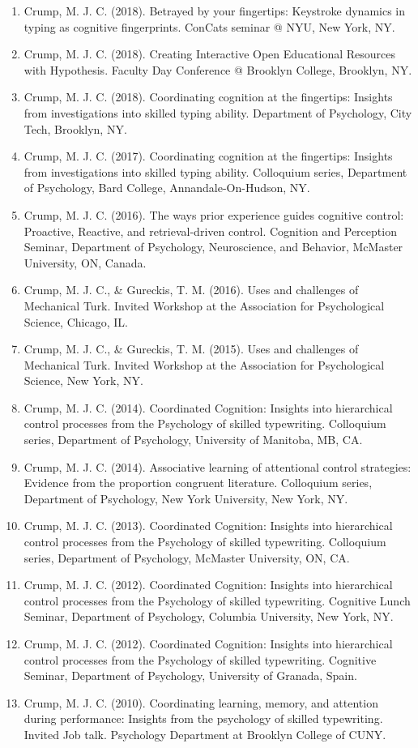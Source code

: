 \documentclass[11pt,a4paper,]{moderncv}
\providecommand{\tightlist}{%
	\setlength{\itemsep}{0pt}\setlength{\parskip}{0pt}}
\begin{document}
\begin{enumerate}
\def\labelenumi{\arabic{enumi}.}
\tightlist
\item
  Crump, M. J. C. (2018). Betrayed by your fingertips: Keystroke dynamics in typing as cognitive fingerprints. ConCats seminar @ NYU, New York, NY.
\item
  Crump, M. J. C. (2018). Creating Interactive Open Educational Resources with Hypothesis. Faculty Day Conference @ Brooklyn College, Brooklyn, NY.
\item
  Crump, M. J. C. (2018). Coordinating cognition at the fingertips: Insights from investigations into skilled typing ability. Department of Psychology, City Tech, Brooklyn, NY.
\item
  Crump, M. J. C. (2017). Coordinating cognition at the fingertips: Insights from investigations into skilled typing ability. Colloquium series, Department of Psychology, Bard College, Annandale-On-Hudson, NY.
\item
  Crump, M. J. C. (2016). The ways prior experience guides cognitive control: Proactive, Reactive, and retrieval-driven control. Cognition and Perception Seminar, Department of Psychology, Neuroscience, and Behavior, McMaster University, ON, Canada.
\item
  Crump, M. J. C., \& Gureckis, T. M. (2016). Uses and challenges of Mechanical Turk. Invited Workshop at the Association for Psychological Science, Chicago, IL.
\item
  Crump, M. J. C., \& Gureckis, T. M. (2015). Uses and challenges of Mechanical Turk. Invited Workshop at the Association for Psychological Science, New York, NY.
\item
  Crump, M. J. C. (2014). Coordinated Cognition: Insights into hierarchical control processes from the Psychology of skilled typewriting. Colloquium series, Department of Psychology, University of Manitoba, MB, CA.
\item
  Crump, M. J. C. (2014). Associative learning of attentional control strategies: Evidence from the proportion congruent literature. Colloquium series, Department of Psychology, New York University, New York, NY.
\item
  Crump, M. J. C. (2013). Coordinated Cognition: Insights into hierarchical control processes from the Psychology of skilled typewriting. Colloquium series, Department of Psychology, McMaster University, ON, CA.
\item
  Crump, M. J. C. (2012). Coordinated Cognition: Insights into hierarchical control processes from the Psychology of skilled typewriting. Cognitive Lunch Seminar, Department of Psychology, Columbia University, New York, NY.
\item
  Crump, M. J. C. (2012). Coordinated Cognition: Insights into hierarchical control processes from the Psychology of skilled typewriting. Cognitive Seminar, Department of Psychology, University of Granada, Spain.
\item
  Crump, M. J. C. (2010). Coordinating learning, memory, and attention during performance: Insights from the psychology of skilled typewriting. Invited Job talk. Psychology Department at Brooklyn College of CUNY.
\end{enumerate}
\end{document}
